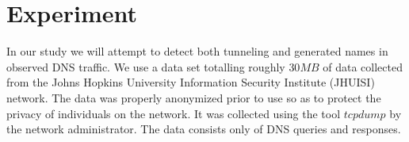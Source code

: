 \section{Experiment}

In our study we will attempt to detect both tunneling and generated names in observed DNS traffic.
We use a data set totalling roughly $30 MB$ of data collected from the Johns Hopkins
University Information Security Institute (JHUISI) network.
The data was properly anonymized prior to use so as to protect the privacy of individuals on the network.
It was collected using the tool $tcpdump$ by the network administrator.
The data consists only of DNS queries and responses.


